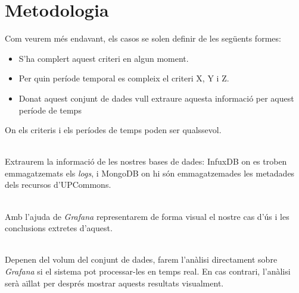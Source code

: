 \section{Metodologia}\label{sec:analysis-visualization-methodology}

\noindent
Com veurem més endavant, els casos se solen definir de les següents formes:

\begin{itemize}
    \item S'ha complert aquest criteri en algun moment.
    \item Per quin període temporal es compleix el criteri X, Y i Z.
    \item Donat aquest conjunt de dades vull extraure aquesta informació per aquest període de temps
\end{itemize}

\noindent
On els criteris i els períodes de temps poden ser qualssevol.

\noindent \\
Extraurem la informació de les nostres bases de dades: InfuxDB on es troben emmagatzemats els \textit{\gls{log}s}, i MongoDB on hi són emmagatzemades les metadades dels recursos d'\gls{UPCommons}.

\noindent \\
Amb l'ajuda de \textit{Grafana} representarem de forma visual el nostre cas d'ús i les conclusions extretes d'aquest.

\noindent \\
Depenen del volum del conjunt de dades,  farem l'anàlisi directament sobre \textit{Grafana} si el sistema pot processar-les en temps real.
En cas contrari, l'anàlisi serà aïllat per després mostrar aquests resultats visualment.

